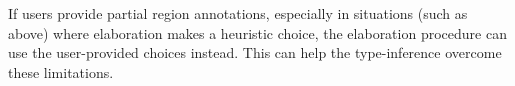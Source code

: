

If users provide partial region annotations, especially in situations (such as above) where elaboration
makes a heuristic choice, the elaboration procedure can use the user-provided choices instead.
This can help the type-inference overcome these limitations.

%
%
%
